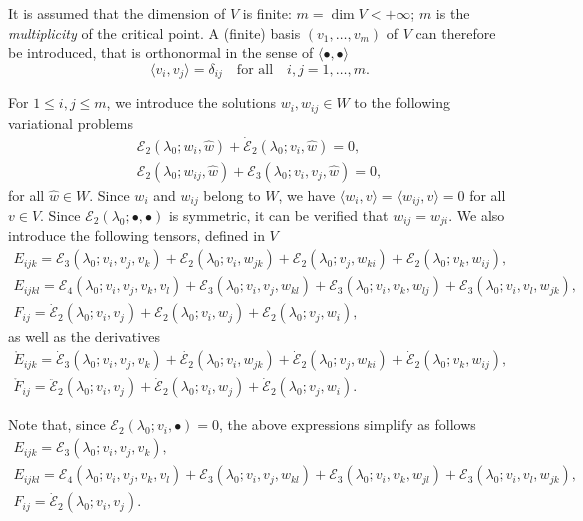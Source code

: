 \documentclass[12pt, final]{scrartcl}
\theoremstyle{definition}
\newcommand{\E}{\mathcal E}
\begin{document}
It is assumed that the dimension of $V$ is finite: $m = \dim V < +\infty$; $m$ is the \emph{multiplicity} of the
critical point. A (finite) basis $(v_1, \ldots, v_m)$ of $V$ can therefore be introduced, that is orthonormal in the
sense of $\langle \bullet, \bullet \rangle$
\begin{equation}
  \langle v_i, v_j \rangle = \delta_{ij} \quad \text{for all} \quad i, j = 1, \ldots, m.
\end{equation}

For $1 \leq i, j \leq m$, we introduce the solutions $w_i, w_{ij} \in W$ to the following variational problems
\begin{gather}
  \label{eq:20220524134525}
  \E_2(\lambda_0; w_i, \hat{w}) + \dot{\E}_2(\lambda_0; v_i, \hat{w}) = 0,\\
  \label{eq:20220519164523}
  \E_2(\lambda_0; w_{i j}, \hat{w})+\E_3(\lambda_0; v_i, v_j, \hat{w}) = 0,
\end{gather}
for all $\hat{w} \in W$. Since $w_{i}$ and $w_{ij}$ belong to $W$, we have
$\langle w_{i}, v \rangle = \langle w_{ij}, v \rangle = 0$ for all $v \in V$. Since $\E_2(\lambda_0; \bullet, \bullet)$
is symmetric, it can be verified that $w_{ij}=w_{ji}$. We also introduce the following tensors, defined in $V$
\begin{gather}
  E_{ijk} = \E_3(\lambda_0; v_i, v_j, v_k) + \E_2(\lambda_0; v_i, w_{jk}) + \E_2(\lambda_0; v_j, w_{ki}) + \E_2(\lambda_0; v_k, w_{ij}),\\
  E_{ijkl} = \E_4(\lambda_0 ; v_i, v_j, v_k, v_l) + \E_3(\lambda_0 ; v_i, v_j, w_{kl}) + \E_3(\lambda_0 ; v_i, v_k, w_{lj}) + \E_3(\lambda_0 ; v_i, v_l, w_{jk}),\\
  F_{ij} = \dot{\E}_2(\lambda_0; v_i, v_j) + \E_2(\lambda_0; v_i, w_j) + \E_2(\lambda_0; v_j, w_i),
\end{gather}
as well as the derivatives
\begin{gather}
  \label{eq:20220615063626}
  \mathring{E}_{ijk} = \dot{\E}_3(\lambda_0; v_i, v_j, v_k) + \dot{\E_2}(\lambda_0; v_i, w_{jk}) + \dot{\E}_2(\lambda_0; v_j, w_{ki}) + \dot{\E}_2(\lambda_0; v_k, w_{ij}),\\
  \label{eq:20220615063633}
  \mathring{F}_{ij} = \ddot{\E}_2(\lambda_0; v_i, v_j) + \dot{\E}_2(\lambda_0; v_i, w_j) + \dot{\E}_2(\lambda_0; v_j, w_i).
\end{gather}

Note that, since $\E_2(\lambda_0; v_i, \bullet) = 0$, the above expressions simplify as follows
\begin{gather}
  \label{eq:20220524135619}
  E_{ijk} = \E_3(\lambda_0; v_i, v_j, v_k),\\
  \label{eq:20220524135553}
  E_{ijkl} = \E_4(\lambda_0 ; v_i, v_j, v_k, v_l) + \E_3(\lambda_0 ; v_i, v_j, w_{kl}) + \E_3(\lambda_0 ; v_i, v_k, w_{jl}) + \E_3(\lambda_0 ; v_i, v_l, w_{jk}),\\
  \label{eq:20220524135643}
  F_{ij} = \dot{\E}_2(\lambda_0; v_i, v_j).
\end{gather}
\end{document}

